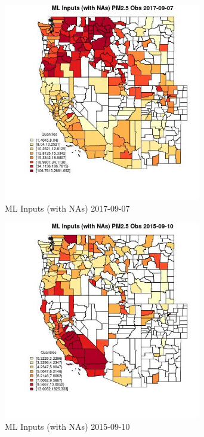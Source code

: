 
\begin{figure} 
\centering  
\includegraphics[width=0.77\textwidth]{Code_Outputs/Report_ML_input_PM25_Step4_part_e_de_duplicated_aveswNAs_CountyPM25_ObsMean2017-09-07_2017-09-07.jpg} 
\caption{\label{fig:Report_ML_input_PM25_Step4_part_e_de_duplicated_aveswNAsCountyPM25_ObsMean2017-09-07_2017-09-07}ML Inputs (with NAs) 2017-09-07} 
\end{figure} 
 

\begin{figure} 
\centering  
\includegraphics[width=0.77\textwidth]{Code_Outputs/Report_ML_input_PM25_Step4_part_e_de_duplicated_aveswNAs_CountyPM25_ObsMean2015-09-10_2015-09-10.jpg} 
\caption{\label{fig:Report_ML_input_PM25_Step4_part_e_de_duplicated_aveswNAsCountyPM25_ObsMean2015-09-10_2015-09-10}ML Inputs (with NAs) 2015-09-10} 
\end{figure} 
 


